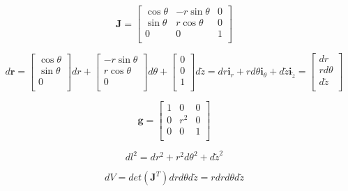 \documentclass
[
a4paper,                      %
twoside,					  %
12pt,                         %
abstract,		      %
fleqn,                        %
]
{scrartcl} %
\begin{document}
\begin{description}
\begin{equation}
\mathbf{J}=\begin{bmatrix}
\cos{\theta}&-r\sin{\theta}&0\\
\sin{\theta}&r\cos{\theta}&0\\
0&0&1\\
\end{bmatrix}
\end{equation}

\begin{equation}
d\mathbf{r}=\begin{bmatrix}
\cos{\theta}\\
\sin{\theta}\\
0\\
\end{bmatrix}dr+\begin{bmatrix}
-r\sin{\theta}\\
r\cos{\theta}\\
0\\
\end{bmatrix}d\theta+\begin{bmatrix}
0\\
0\\
1\\
\end{bmatrix}d\tilde{z}=dr\mathbf{i}_{r}+rd\theta\mathbf{i}_{\theta}+d\tilde{z}\mathbf{i}_{\tilde{z}}=\begin{bmatrix}
dr\\
rd\theta\\
d\tilde{z}\\
\end{bmatrix}
\end{equation}

\begin{equation}
\mathbf{g}=
\begin{bmatrix}
1&0&0\\
0&r^{2}&0\\
0&0&1\\
\end{bmatrix}
\end{equation}

\begin{equation}
dl^{2}=dr^{2}+r^{2}d\theta^{2}+d\tilde{z}^{2}
\end{equation}

\begin{equation}
dV=det\left(\mathbf{J}^{T}\right)drd\theta d\tilde{z}=rdrd\theta d\tilde{z}
\end{equation}


\end{description}
\end{document}
